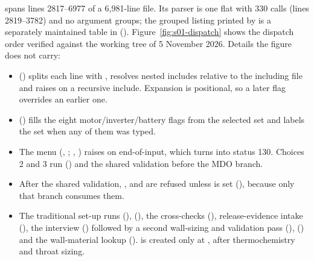  spans lines 2817--6977 of a 6,981-line file. Its parser is one flat  with 330  calls (lines 2819--3782) and no argument groups; the grouped listing printed by  is a separately maintained table in  (). Figure~\ref{fig:s01-dispatch} shows the dispatch order verified against the working tree of 5 November 2026. Details the figure does not carry:
\begin{itemize}
  \item {} () splits each line with   , resolves nested  includes relative to the including file and raises on a recursive include. Expansion is positional, so a later flag overrides an earlier one.
  \item {} () fills the eight motor/inverter/battery flags from the selected  set and labels the set  when any of them was typed.
  \item The menu (, ; , ) raises on end-of-input, which  turns into status 130. Choices 2 and 3 run  () and the shared validation before the MDO branch.
  \item After the shared validation, ,  and  are refused unless  is set (), because only that branch consumes them.
  \item The traditional set-up runs  (),  (), the cross-checks (), release-evidence intake (), the interview  () followed by a second wall-sizing and validation pass (),  () and the wall-material lookup ().  is created only at , after thermochemistry and throat sizing.
\end{itemize}

